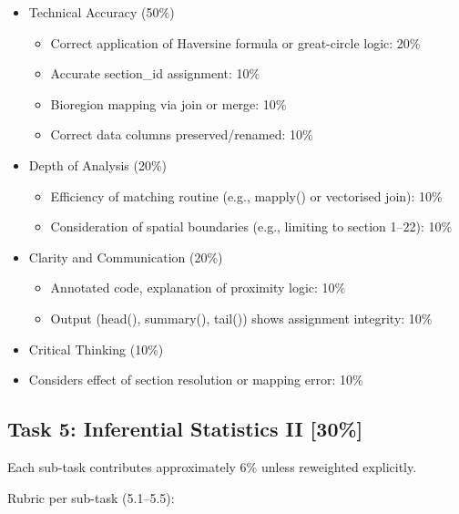 \documentclass[
  10pt,
]{article}
\providecommand{\tightlist}{%
  \setlength{\itemsep}{0pt}\setlength{\parskip}{0pt}}
\begin{document}
\begin{itemize}
\tightlist
\item
  Technical Accuracy (50\%)

  \begin{itemize}
  \tightlist
  \item
    Correct application of Haversine formula or great-circle logic: 20\%
  \item
    Accurate section\_id assignment: 10\%
  \item
    Bioregion mapping via join or merge: 10\%
  \item
    Correct data columns preserved/renamed: 10\%
  \end{itemize}
\item
  Depth of Analysis (20\%)

  \begin{itemize}
  \tightlist
  \item
    Efficiency of matching routine (e.g., mapply() or vectorised join):
    10\%
  \item
    Consideration of spatial boundaries (e.g., limiting to section
    1--22): 10\%
  \end{itemize}
\item
  Clarity and Communication (20\%)

  \begin{itemize}
  \tightlist
  \item
    Annotated code, explanation of proximity logic: 10\%
  \item
    Output (head(), summary(), tail()) shows assignment integrity: 10\%
  \end{itemize}
\item
  Critical Thinking (10\%)
\item
  Considers effect of section resolution or mapping error: 10\%
\end{itemize}

\subsection{Task 5: Inferential Statistics II
{[}30\%{]}}\label{task-5-inferential-statistics-ii-30}

Each sub-task contributes approximately 6\% unless reweighted
explicitly.

Rubric per sub-task (5.1--5.5):
\end{document}
